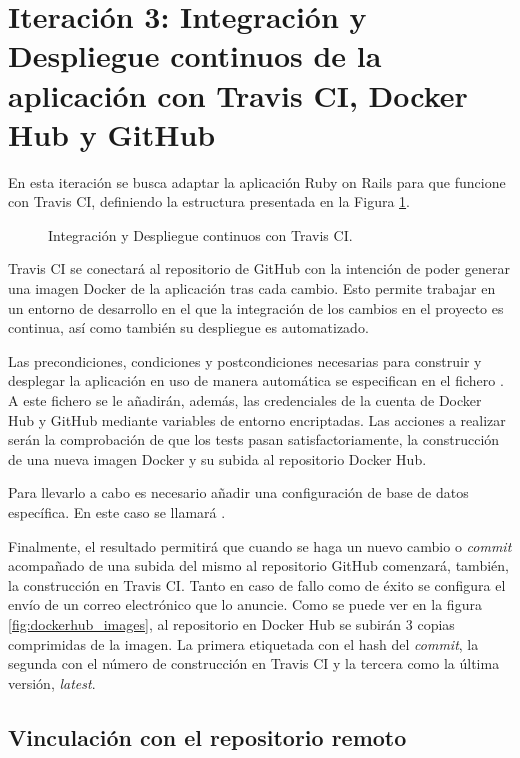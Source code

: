\section[Iteración 3: Integración y Despliegue continuos]{Iteración 3: Integración y Despliegue continuos de la aplicación con Travis CI, Docker Hub y GitHub}

En esta iteración se busca adaptar la aplicación Ruby on Rails para que funcione con Travis CI, definiendo la estructura presentada en la Figura \ref{fig:iteration2}. 

\begin{figure}[H]
\caption{Integración y Despliegue continuos con Travis CI. \label{fig:iteration2}}
\end{figure}

Travis CI se conectará al repositorio de GitHub  con la intención de poder generar una imagen Docker de la aplicación tras cada cambio. Esto permite trabajar en un entorno de desarrollo en el que la integración de los cambios en el proyecto es continua, así como también su despliegue es automatizado.

Las precondiciones, condiciones y postcondiciones necesarias para construir y desplegar la aplicación en uso de manera automática se especifican en el fichero . A este fichero se le añadirán, además, las credenciales de la cuenta de Docker Hub y GitHub mediante variables de entorno encriptadas. Las acciones a realizar serán la comprobación de que los tests pasan satisfactoriamente, la construcción de una nueva imagen Docker y su subida al repositorio Docker Hub.

Para llevarlo a cabo es necesario añadir una configuración de base de datos específica. En este caso se llamará .

Finalmente, el resultado permitirá que cuando se haga un nuevo cambio o \textit{commit} acompañado de una subida del mismo al repositorio GitHub comenzará, también, la construcción en Travis CI. Tanto en caso de fallo como de éxito se configura el envío de un correo electrónico que lo anuncie. Como se puede ver en la figura \ref{fig:dockerhub_images}, al repositorio en Docker Hub se subirán 3 copias comprimidas de la imagen. La primera etiquetada con el hash del \textit{commit}, la segunda con el número de construcción en Travis CI y la tercera como la última versión, \textit{latest}.

\subsection{Vinculación con el repositorio remoto}

